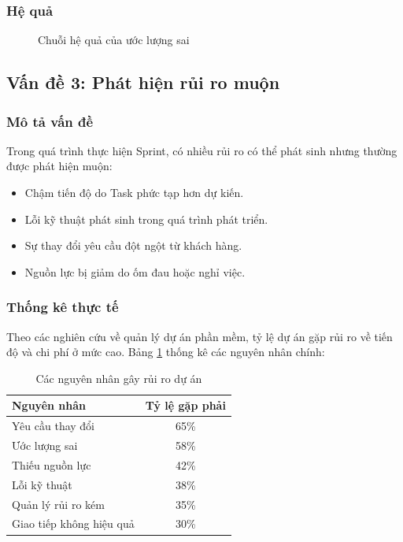 \documentclass[12pt,a4paper]{report}
\begin{document}
\subsubsection{Hệ quả}

\begin{figure}[H]
\centering
{}
\caption{Chuỗi hệ quả của ước lượng sai}
\label{fig:estimation_consequences}
\end{figure}

\subsection{Vấn đề 3: Phát hiện rủi ro muộn}

\subsubsection{Mô tả vấn đề}

Trong quá trình thực hiện Sprint, có nhiều rủi ro có thể phát sinh nhưng thường được phát hiện muộn:

\begin{itemize}
\item Chậm tiến độ do Task phức tạp hơn dự kiến.
\item Lỗi kỹ thuật phát sinh trong quá trình phát triển.
\item Sự thay đổi yêu cầu đột ngột từ khách hàng.
\item Nguồn lực bị giảm do ốm đau hoặc nghỉ việc.
\end{itemize}

\subsubsection{Thống kê thực tế}

Theo các nghiên cứu về quản lý dự án phần mềm, tỷ lệ dự án gặp rủi ro về tiến độ và chi phí ở mức cao. Bảng \ref{tab:risk_statistics} thống kê các nguyên nhân chính:

\begin{table}[H]
\centering
\caption{Các nguyên nhân gây rủi ro dự án}
\begin{tabular}{|p{6cm}|c|}
\hline
\textbf{Nguyên nhân} & \textbf{Tỷ lệ gặp phải} \\
\hline
Yêu cầu thay đổi & 65\% \\
\hline
Ước lượng sai & 58\% \\
\hline
Thiếu nguồn lực & 42\% \\
\hline
Lỗi kỹ thuật & 38\% \\
\hline
Quản lý rủi ro kém & 35\% \\
\hline
Giao tiếp không hiệu quả & 30\% \\
\hline
\end{tabular}
\label{tab:risk_statistics}
\end{table}
\end{document}
